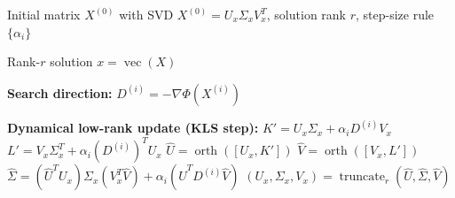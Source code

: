 \begin{algorithm}
\caption{Schotthöfer et al.'s DLRA scheme}
\label{alg:dlra}
\begin{algorithmic}[1]

\Require Initial matrix $X^{(0)}$ with SVD $X^{(0)} = U_x \Sigma_x V_x^T$, solution rank $r$, step-size rule $\{\alpha_i\}$

\Ensure Rank-$r$ solution $x = \operatorname{vec}(X)$


    \State \textbf{Search direction:}
    \State $D^{(i)} = -\nabla \Phi(X^{(i)})$

    \State \textbf{Dynamical low-rank update (KLS step):}
    \State $K' = U_x \Sigma_x + \alpha_i D^{(i)} V_x$
    \State $L' = V_x \Sigma_x^T + \alpha_i (D^{(i)})^T U_x$
    \State $\hat U = \operatorname{orth}([U_x, K'])$
    \State $\hat V = \operatorname{orth}([V_x, L'])$
    \State $\hat \Sigma = (\hat U^T U_x)\Sigma_x(V_x^T \hat V) + \alpha_i (\hat U^T D^{(i)} \hat V)$
    \State $(U_x, \Sigma_x, V_x) = \operatorname{truncate}_r(\hat U, \hat \Sigma, \hat V)$

\EndFor

\end{algorithmic}
\end{algorithm}